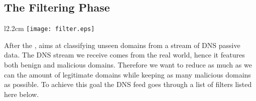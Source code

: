 

\subsection{The Filtering Phase} %
\label{sub:the_filtering_phase}
\begin{wrapfigure}{l}{2.2cm}
\centering
    \texttt{[image: filter.eps]}
\end{wrapfigure}
After the , \thesystem aims at classifying unseen
domains from a stream of DNS passive data.
The DNS stream we receive comes from the real world, hence it features both benign and malicious
domains. Therefore we want to reduce as much as we can the amount of legitimate domains
while keeping as many malicious domains as possible. To achieve this goal the DNS feed goes
through a list of filters listed here below.

